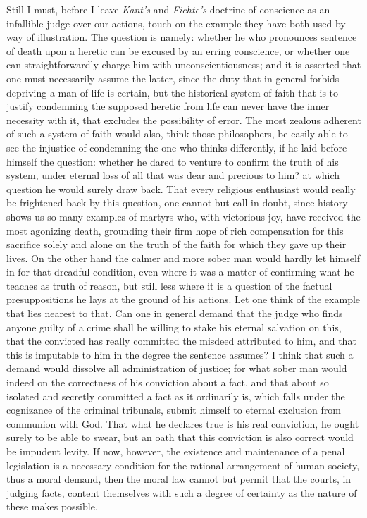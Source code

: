 \documentclass[12pt,a4paper,openany]{book}
\newcommand{\opage}[1]{\marginnote{\footnotesize\textit{[#1]}}}
\begin{document}
Still I must, before I leave \emph{Kant's} and \emph{Fichte's} doctrine of conscience
as an infallible judge over our actions, touch on the example they have both used by
way of illustration. The question is namely: whether he who pronounces sentence of
death upon a heretic can be excused by an erring conscience, or whether one can
straightforwardly charge him with unconscientiousness; and it is asserted that one
must necessarily assume the latter, since the duty that in general forbids depriving
a man of life is certain, but the historical system of faith that is to justify
condemning the supposed heretic from life can never have the inner
\setcounter{footnote}{0}%
\opage{96}necessity with it, that excludes the possibility of error. The most zealous
adherent of such a system of faith would also, think those philosophers, be easily
able to see the injustice of condemning the one who thinks differently, if he laid
before himself the question: whether he dared to venture to confirm the truth of his
system, under eternal loss of all that was dear and precious to him? at which
question he would surely draw back. That every religious enthusiast would really be
frightened back by this question, one cannot but call in doubt, since history shows
us so many examples of martyrs who, with victorious joy, have received the most
agonizing death, grounding their firm hope of rich compensation for this sacrifice
solely and alone on the truth of the faith for which they gave up their lives. On the
other hand the calmer and more sober man would hardly let himself in for that
dreadful condition, even where it was a matter of confirming what he teaches as
truth of reason, but still less where it is a question of the factual presuppositions
he lays at the ground of his actions. Let one think of the example that lies nearest
to that. Can one in general demand that the judge who finds anyone guilty of a crime
shall be willing to stake his eternal salvation on this, that the convicted has
really committed the misdeed attributed to him, and that this is imputable to him in
the degree the sentence assumes? I think that such a demand would dissolve all
administration of justice; for what sober man would indeed on the correctness of his
conviction about a fact, and that about so isolated and secretly committed a fact as
it ordinarily is, which falls under the cognizance of the criminal tribunals, submit
himself to eternal exclusion from communion with God. That what he declares true is
his real conviction, he ought surely to be able to swear, but an oath that this
conviction is also correct would be impudent levity. If now, however, the existence
and maintenance of a penal legislation is a necessary condition for the rational
\setcounter{footnote}{0}%
\opage{97}arrangement of human society, thus a moral demand, then the moral law cannot but
permit that the courts, in judging facts, content themselves with such a degree of
certainty as the nature of these makes possible.
\end{document}
